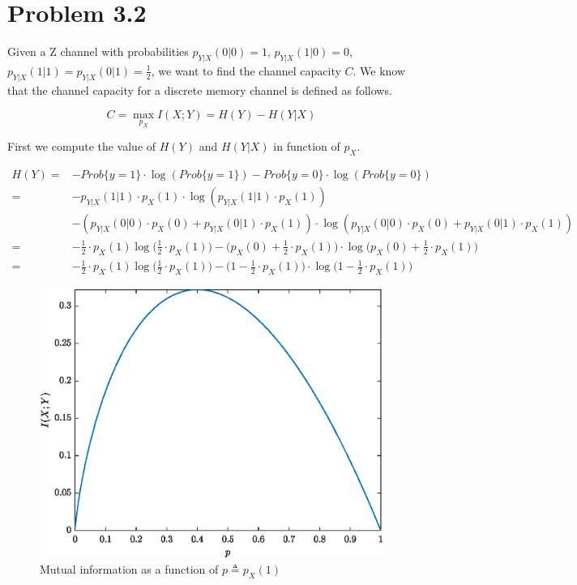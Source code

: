 \section{Problem 3.2}

Given a Z channel with probabilities $p_{Y|X}(0|0)=1$, $p_{Y|X}(1|0)=0$, $p_{Y|X}(1|1)=p_{Y|X}(0|1)=\frac{1}{2}$, we want to find the channel capacity $C$. We know that the channel capacity for a discrete memory channel is defined as follows.

\begin{equation}
	C = \max_{p_X} I(X;Y) = H(Y)-H(Y|X)
\end{equation}

First we compute the value of $H(Y)$ and $H(Y|X)$ in function of $p_X$.

\begin{align*}
	H(Y)= & -Prob\{y=1\}\cdot\log(Prob\{y=1\})-Prob\{y=0\}\cdot\log(Prob\{y=0\}) \\
	= & -p_{Y|X}(1|1) \cdot p_X(1) \cdot\log(p_{Y|X}(1|1) \cdot p_X(1)) \\ & -(p_{Y|X}(0|0) \cdot p_X(0) + p_{Y|X}(0|1) \cdot p_X(1)) \cdot\log(p_{Y|X}(0|0) \cdot p_X(0) + p_{Y|X}(0|1) \cdot p_X(1)) \\
	= & -\frac{1}{2}\cdot p_X(1)\log\Big(\frac{1}{2}\cdot p_X(1)\Big)-\Big(p_X(0)+\frac{1}{2}\cdot p_X(1)\Big)\cdot \log \Big(p_X(0)+\frac{1}{2}\cdot p_X(1)\Big) \\
	= & -\frac{1}{2}\cdot p_X(1)\log\Big(\frac{1}{2}\cdot p_X(1)\Big)-\Big(1-\frac{1}{2}\cdot p_X(1)\Big)\cdot \log \Big(1-\frac{1}{2}\cdot p_X(1)\Big)
\end{align*}

\begin{figure}[h]
	\centering
	\includegraphics[width=0.7\linewidth]{img/func_info_ex1}
	\caption{Mutual information as a function of $p \triangleq p_X(1)$}
	\label{fig:funcinfoex1}
\end{figure}
